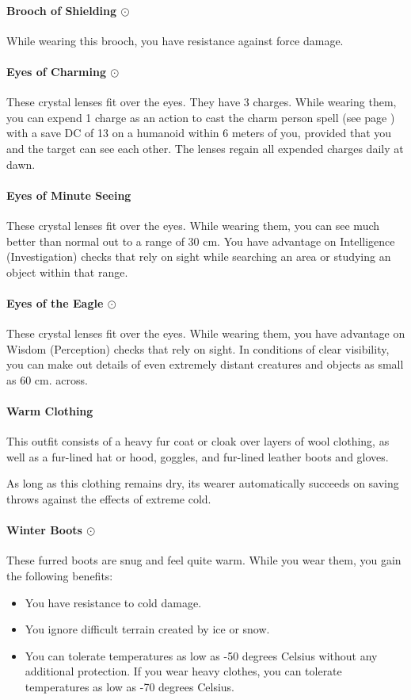     \paragraph{Brooch of Shielding $\odot$}
        While wearing this brooch, you have resistance against force damage.
    \paragraph{Eyes of Charming $\odot$}
        These crystal lenses fit over the eyes.
        They have 3 charges.
        While wearing them, you can expend 1 charge as an action to cast the charm person spell (see page \pageref{spell::charmperson}) with a save DC of 13 on a humanoid within 6 meters of you, provided that you and the target can see each other.
        The lenses regain all expended charges daily at dawn.
    \paragraph{Eyes of Minute Seeing}
        These crystal lenses fit over the eyes.
        While wearing them, you can see much better than normal out to a range of 30 cm.
        You have advantage on Intelligence (Investigation) checks that rely on sight while searching an area or studying an object within that range.
    \paragraph{Eyes of the Eagle $\odot$}
        These crystal lenses fit over the eyes.
        While wearing them, you have advantage on Wisdom (Perception) checks that rely on sight.
        In conditions of clear visibility, you can make out details of even extremely distant creatures and objects as small as 60 cm. across.
    \paragraph{Warm Clothing}
        This outfit consists of a heavy fur coat or cloak over layers of wool clothing, as well as a fur-lined hat or hood, goggles, and fur-lined leather boots and gloves.

        As long as this clothing remains dry, its wearer automatically succeeds on saving throws against the effects of extreme cold.
    \paragraph{Winter Boots $\odot$}
        These furred boots are snug and feel quite warm.
        While you wear them, you gain the following benefits:
        \begin{itemize}
            \item You have resistance to cold damage.
            \item You ignore difficult terrain created by ice or snow.
            \item You can tolerate temperatures as low as -50 degrees Celsius without any additional protection.
            If you wear heavy clothes, you can tolerate temperatures as low as -70 degrees Celsius.
        \end{itemize}
\newpage~\newpage
